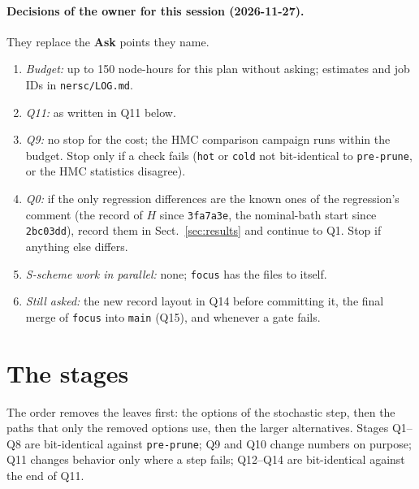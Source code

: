 \documentclass[11pt,aps,preprint,nofootinbib,superscriptaddress,tightenlines]{revtex4-2}
\def\Sect#1{Sect.~\ref{#1}}
\let\oldparagraph\paragraph
\renewcommand{\paragraph}{\par\bigskip\oldparagraph}
\newcommand{\ask}{\textbf{Ask}}
\begin{document}
\paragraph{Decisions of the owner for this session (2026-11-27).}  They replace the \ask{} points they name.
\begin{enumerate}
\item \emph{Budget:} up to 150 node-hours for this plan without asking; estimates and job IDs in \nolinkurl{nersc/LOG.md}.
\item \emph{Q11:} as written in Q11 below.
\item \emph{Q9:} no stop for the cost; the HMC comparison campaign runs within the budget.  Stop only if a check fails (\texttt{hot} or
  \texttt{cold} not bit-identical to \texttt{pre-prune}, or the HMC statistics disagree).
\item \emph{Q0:} if the only regression differences are the known ones of the regression's comment (the record of $H$ since
  \texttt{3fa7a3e}, the nominal-bath start since \texttt{2bc03dd}), record them in \Sect{sec:results} and continue to Q1.  Stop if anything
  else differs.
\item \emph{S-scheme work in parallel:} none; \texttt{focus} has the files to itself.
\item \emph{Still asked:} the new record layout in Q14 before committing it, the final merge of \texttt{focus} into \texttt{main} (Q15), and
  whenever a gate fails.
\end{enumerate}

\section{The stages}
\label{sec:stages}

The order removes the leaves first: the options of the stochastic step, then the paths that only the removed options use, then the larger
alternatives.  Stages Q1--Q8 are bit-identical against \texttt{pre-prune}; Q9 and Q10 change numbers on purpose; Q11 changes behavior only where
a step fails; Q12--Q14 are bit-identical against the end of Q11.
\end{document}

